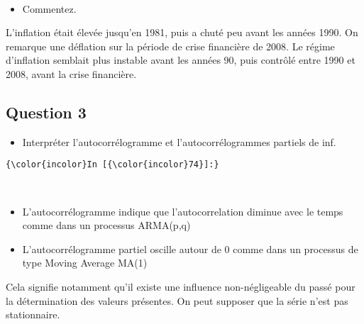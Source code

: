 \documentclass[11pt]{article}
\providecommand{\tightlist}{%
      \setlength{\itemsep}{0pt}\setlength{\parskip}{0pt}}
\begin{document}
    \begin{center}
    \end{center}
    { \hspace*{\fill} \\}
    
    \begin{itemize}
\tightlist
\item
  Commentez.
\end{itemize}

    L'inflation était élevée jusqu'en 1981, puis a chuté peu avant les
années 1990. On remarque une déflation sur la période de crise
financière de 2008. Le régime d'inflation semblait plus instable avant
les années 90, puis contrôlé entre 1990 et 2008, avant la crise
financière.

    \subsection{Question 3}\label{question-3}

\begin{itemize}
\tightlist
\item
  Interpréter l'autocorrélogramme et l'autocorrélogrammes partiels de
  inf. 
\end{itemize}

    \begin{Verbatim}[commandchars=\\\{\}]
{\color{incolor}In [{\color{incolor}74}]:} 
\end{Verbatim}


    \begin{center}
    \end{center}
    { \hspace*{\fill} \\}
    
    \begin{itemize}
\tightlist
\item
  L'autocorrélogramme indique que l'autocorrelation diminue avec le
  temps comme dans un processus ARMA(p,q)
\item
  L'autocorrélogramme partiel oscille autour de 0 comme dans un
  processus de type Moving Average MA(1)
\end{itemize}

Cela signifie notamment qu'il existe une influence non-négligeable du
passé pour la détermination des valeurs présentes. On peut supposer que
la série n'est pas stationnaire.
\end{document}
